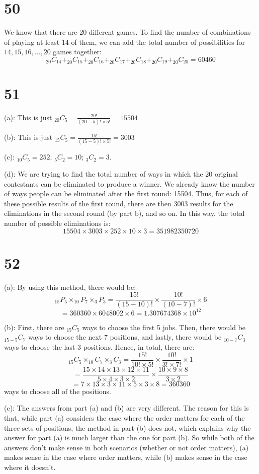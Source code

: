 \documentclass{article}
\theoremstyle{definition}
\newcommand{\?}{\stackrel{?}{=}}
\begin{document}
\section*{50}
We know that there are 20 different games. To find the number of combinations of playing at least 14 of them, we can add the total number of possibilities 
for $14,15,16,...,20$ games together:
\[ _{20}C_{14}+_{20}C_{15}+_{20}C_{16}+_{20}C_{17}+_{20}C_{18}+_{20}C_{19}+_{20}C_{20}=60460 \]

\section*{51}
(a): This is just $_{20}C_{5}=\frac{20!}{\left(20-5\right)!\times 5!}=15504$


(b): This is just $_{15}C_5=\frac{15!}{\left(15-5\right)!\times 5!}=3003$


(c): $_{10}C_{5}=252$; $_5C_2=10$; $_3C_2=3$.


(d): We are trying to find the total number of ways in which the 20 original contestants can be eliminated to produce a winner. We already know the 
number of ways people can be eliminated after the first round: 15504. Thus, for each of these possible results of the first round, there are then 
3003 results for the eliminations in the second round (by part b), and so on. In this way, the total number of possible eliminations is:
\[ 15504\times 3003\times 252\times 10\times 3=351982350720 \] 

\section*{52}
(a): By using this method, there would be:
\[ _{15}P_5\times _{10}P_7\times _3P_3=\dfrac{15!}{\left(15-10\right)!}\times\dfrac{10!}{\left(10-7\right)!}\times 6 \]
\[ =360360\times 6048002\times 6=1.307674368\times 10^{12} \]


(b): First, there are $_{15}C_5$ ways to choose the first 5 jobs. Then, there would be $_{15-5}C_7$ ways to choose the next 7 positions, and lastly, there would be $_{10-7}C_3$ ways to choose the last 3 positions. 
Hence, in total, there are: \[ _{15}C_5\times _{10}C_7\times _3C_3=\frac{15!}{10!\times 5!}\times \frac{10!}{3!\times 7!}\times 1 \]
\[ =\frac{15\times 14\times 13\times 12\times 11}{5\times 4\times 3\times 2}\times\frac{10\times 9\times 8}{3\times 2} \]
\[ =7\times 13\times 3\times 11\times 5\times 3\times 8=360360 \] ways to choose all of the positions. 


(c): The answers from part (a) and (b) are very different. The reason for this is that, while part (a) considers the case where the order matters for each of the three sets of positions, the method in part (b) does not, 
which explains why the answer for part (a) is much larger than the one for part (b). So while both of the answers don't make sense in both scenarios (whether or not order matters), (a) makes sense in the case where order 
matters, while (b) makes sense in the case where it doesn't.
\end{document}
